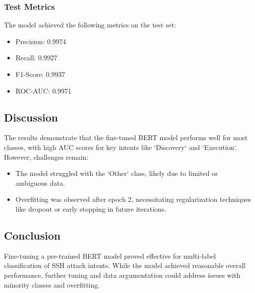         \subsubsection{Test Metrics \\}
        
            The model achieved the following metrics on the test set:
            
            \begin{itemize}
                \item Precision: 0.9974
                \item Recall: 0.9927
                \item F1-Score: 0.9937
                \item ROC-AUC: 0.9971
            \end{itemize}

    \subsection{Discussion}
    
        The results demonstrate that the fine-tuned BERT model performs well for most classes, with high AUC scores for key intents like `Discovery` and `Execution`. However, challenges remain:
        
        \begin{itemize}
        
            \item The model struggled with the `Other` class, likely due to limited or ambiguous data.
            
            \item Overfitting was observed after epoch 2, necessitating regularization techniques like dropout or early stopping in future iterations.
            
        \end{itemize}

    \subsection{Conclusion}
    
        Fine-tuning a pre-trained BERT model proved effective for multi-label classification of SSH attack intents. While the model achieved reasonable overall performance, further tuning and data argumentation could address issues with minority classes and overfitting.
